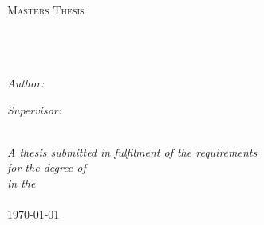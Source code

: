 \documentclass[11pt, oneside, utf8,latin1]{Thesis} %
\theoremstyle{definition}
\begin{document}
\begin{titlepage}
\begin{center}

\textsc{\LARGE \univname}\\[1.5cm] %
\textsc{\Large Masters Thesis}\\[0.5cm] %

\HRule \\[0.4cm] %
{\huge \bfseries \ttitle}\\[0.4cm] %
\HRule \\[1.5cm] %

\begin{minipage}{0.4\textwidth}
\begin{flushleft} \large
\emph{Author:}\\
\href{http://bringvictory.com/}{\authornames} %
\end{flushleft}
\end{minipage}
\begin{minipage}{0.4\textwidth}
\begin{flushright} \large
\emph{Supervisor:} \\
\href{http://lucalongo.eu/}{\supname} %
\end{flushright}
\end{minipage}\\[3cm]

\large \textit{A thesis submitted in fulfilment of the requirements\\ for the degree of \degreename}\\[0.3cm] %
\textit{in the}\\[0.4cm]
\deptname\\[2cm] %

{\large \today}\\[4cm] %

\vfill
\end{center}

\end{titlepage}

\end{document}
